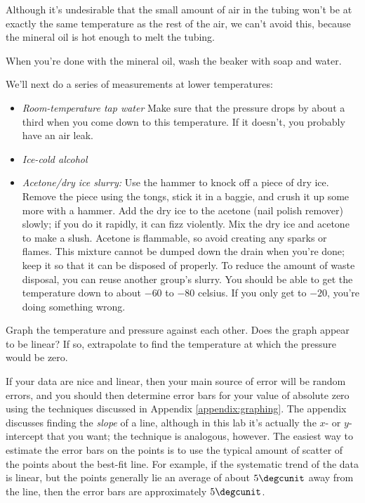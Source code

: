 Although it's undesirable that the small amount of air in the tubing
won't be at exactly the same temperature as the rest of the air, we can't
avoid this, because the mineral oil is hot enough to melt the tubing.

When you're done with the mineral oil, wash the beaker with soap and water.

We'll next do a series of measurements at lower temperatures:

\begin{itemize}
\item \emph{Room-temperature tap water} Make sure that the pressure
drops by about a third when you come down to this temperature. If it
doesn't, you probably have an air leak.

\item \emph{Ice-cold alcohol}

\item \emph{Acetone/dry ice slurry:}
Use the hammer to knock off a piece of dry ice. Remove the piece
using the tongs, stick it in a baggie, and crush it up some more
with a hammer.
Add the dry ice to the acetone (nail polish remover) slowly; if you
do it rapidly, it can fizz violently.
Mix the dry ice and acetone to make a slush.
Acetone is flammable, so avoid creating any sparks or flames.
This mixture cannot be dumped down the drain when you're done;
keep it so that it can be disposed of properly. To reduce the amount
of waste disposal, you can reuse another group's slurry.
You should be able to get the temperature down to about $-60$ to
$-80$ celsius. If you only get to $-20$, you're doing something wrong.
\end{itemize}

\analysis

Graph the temperature and pressure against each other. Does
the graph appear to be linear? If so, extrapolate to find
the temperature at which the pressure would be zero. 

If your data are nice and linear, then your main source of
error will be random errors, and you should then determine
error bars for your value of absolute zero using the
techniques discussed in Appendix \ref{appendix:graphing}.
The appendix discusses finding the \emph{slope} of a line,
although in this lab it's actually the $x$- or $y$-intercept that you want;
the technique is analogous, however.
The easiest way to estimate the error bars on the points
is to use the typical amount of scatter of the points about
the best-fit line. For example, if the systematic trend of the
data is linear, but the points generally lie an average of
about $5\degcunit$ away from the line, then the error bars
are approximately $5\degcunit$.
